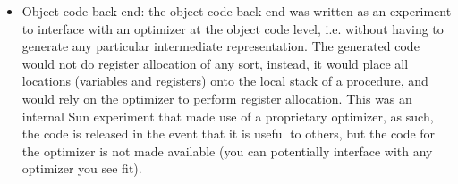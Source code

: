 \begin{description}
\begin{itemize}
\item Object code back end: the object code back end was written as an 
	experiment to interface with an optimizer at the object code level, 
	i.e. without having to generate any particular intermediate 
	representation.  The generated code would not do register allocation 
	of any sort, instead, it would place all locations (variables and 
	registers) onto the local stack of a procedure, and would rely on 
	the optimizer to perform register allocation.  This was an internal 
	Sun experiment that made use of a proprietary optimizer, as such, 
	the code is released in the event that it is useful to others, but
	the code for the optimizer is not made available (you can potentially
	interface with any optimizer you see fit).   
\end{itemize}


\end{description}


